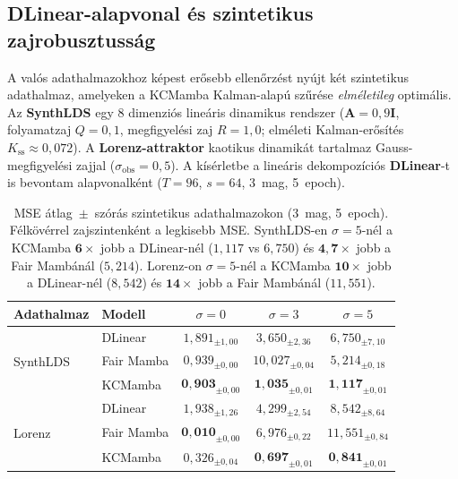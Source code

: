 \subsection{DLinear-alapvonal és szintetikus zajrobusztusság}
\label{sec:dlinear_synth}

A valós adathalmazokhoz képest erősebb ellenőrzést nyújt két szintetikus adathalmaz,
amelyeken a KCMamba Kalman-alapú szűrése \emph{elméletileg} optimális.
Az \textbf{SynthLDS} egy 8 dimenziós lineáris dinamikus rendszer
($\mathbf{A}=0{,}9\mathbf{I}$, folyamatzaj $Q=0{,}1$, megfigyelési zaj $R=1{,}0$;
elméleti Kalman-erősítés $K_\text{ss}\approx0{,}072$). A \textbf{Lorenz-attraktor}
kaotikus dinamikát tartalmaz Gauss-megfigyelési zajjal ($\sigma_\text{obs}=0{,}5$).
A kísérletbe a lineáris dekompozíciós \textbf{DLinear}-t~\cite{zeng2023transformers}
is bevontam alapvonalként ($T{=}96$, $s{=}64$, 3~mag, 5~epoch).

\begin{table}[H]
  \centering
  \small
  \begin{tabular}{|l|l|ccc|}
    \hline
    \textbf{Adathalmaz} & \textbf{Modell} &
    $\sigma=0$ & $\sigma=3$ & $\sigma=5$ \\
    \hline\hline
    \multirow{3}{*}{SynthLDS}
      & DLinear    & $1{,}891_{\pm1{,}00}$ & $3{,}650_{\pm2{,}36}$ & $6{,}750_{\pm7{,}10}$ \\
      & Fair Mamba & $0{,}939_{\pm0{,}00}$ & $10{,}027_{\pm0{,}04}$ & $5{,}214_{\pm0{,}18}$ \\
      & KCMamba    & $\mathbf{0{,}903}_{\pm0{,}00}$ & $\mathbf{1{,}035}_{\pm0{,}01}$ & $\mathbf{1{,}117}_{\pm0{,}01}$ \\
    \hline
    \multirow{3}{*}{Lorenz}
      & DLinear    & $1{,}938_{\pm1{,}26}$ & $4{,}299_{\pm2{,}54}$ & $8{,}542_{\pm8{,}64}$ \\
      & Fair Mamba & $\mathbf{0{,}010}_{\pm0{,}00}$ & $6{,}976_{\pm0{,}22}$ & $11{,}551_{\pm0{,}84}$ \\
      & KCMamba    & $0{,}326_{\pm0{,}04}$ & $\mathbf{0{,}697}_{\pm0{,}01}$ & $\mathbf{0{,}841}_{\pm0{,}01}$ \\
    \hline
  \end{tabular}
  \caption{MSE átlag~$\pm$~szórás szintetikus adathalmazokon (3~mag, 5~epoch).
           Félkövérrel zajszintenként a legkisebb MSE.
           SynthLDS-en $\sigma{=}5$-nél a KCMamba $\mathbf{6\times}$ jobb a
           DLinear-nél ($1{,}117$ vs $6{,}750$) és $\mathbf{4{,}7\times}$ jobb a
           Fair Mambánál ($5{,}214$).
           Lorenz-on $\sigma{=}5$-nél a KCMamba $\mathbf{10\times}$ jobb a
           DLinear-nél ($8{,}542$) és $\mathbf{14\times}$ jobb a Fair Mambánál ($11{,}551$).}
  \label{tab:synth_noise}
\end{table}

